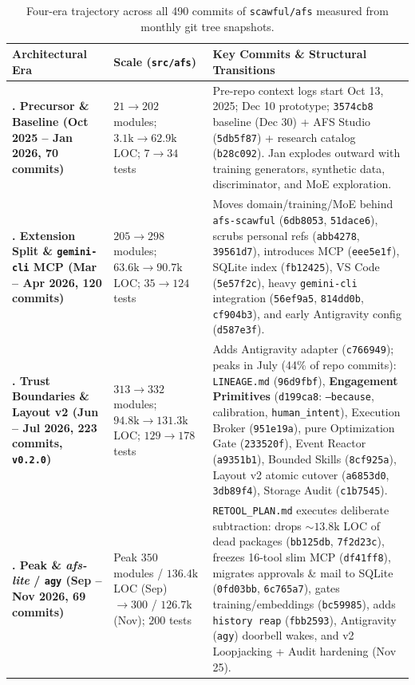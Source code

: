 \documentclass[10pt,letterpaper]{article}
\newcommand{\code}[1]{\texttt{\color{InkNavy}#1}}
\begin{document}
\begin{table}[ht!]
\centering
\sffamily\footnotesize
\begin{tabularx}{\textwidth}{@{}>{\raggedright\bfseries\arraybackslash}p{2.7cm} >{\raggedright\arraybackslash}p{2.6cm} >{\raggedright\arraybackslash}X@{}}
\toprule
\color{InkNavy}Architectural Era & \color{InkNavy}Scale (\code{src/afs}) & \color{InkNavy}Key Commits \& Structural Transitions \\
\midrule
1. Precursor \& Baseline (Oct 2025 -- Jan 2026, 70 commits) &
$21 \rightarrow 202$ modules; $3.1\text{k} \rightarrow 62.9\text{k}$ LOC; $7 \rightarrow 34$ tests &
Pre-repo context logs start Oct 13, 2025; Dec 10 prototype; \code{3574cb8} baseline (Dec 30) + AFS Studio (\code{5db5f87}) + research catalog (\code{b28c092}). Jan explodes outward with training generators, synthetic data, discriminator, and MoE exploration. \\
\addlinespace[2.5pt]
2. Extension Split \& \code{gemini-cli} MCP (Mar -- Apr 2026, 120 commits) &
$205 \rightarrow 298$ modules; $63.6\text{k} \rightarrow 90.7\text{k}$ LOC; $35 \rightarrow 124$ tests &
Moves domain/training/MoE behind \code{afs-scawful} (\code{6db8053}, \code{51dace6}), scrubs personal refs (\code{abb4278}, \code{39561d7}), introduces MCP (\code{eee5e1f}), SQLite index (\code{fb12425}), VS Code (\code{5e57f2c}), heavy \code{gemini-cli} integration (\code{56ef9a5}, \code{814dd0b}, \code{cf904b3}), and early Antigravity config (\code{d587e3f}). \\
\addlinespace[2.5pt]
3. Trust Boundaries \& Layout v2 (Jun -- Jul 2026, 223 commits, \code{v0.2.0}) &
$313 \rightarrow 332$ modules; $94.8\text{k} \rightarrow 131.3\text{k}$ LOC; $129 \rightarrow 178$ tests &
Adds Antigravity adapter (\code{c766949}); peaks in July (44\% of repo commits): \code{LINEAGE.md} (\code{96d9fbf}), \textbf{Engagement Primitives} (\code{d199ca8}: \code{--because}, calibration, \code{human\_intent}), Execution Broker (\code{951e19a}), pure Optimization Gate (\code{233520f}), Event Reactor (\code{a9351b1}), Bounded Skills (\code{8cf925a}), Layout v2 atomic cutover (\code{a6853d0}, \code{3db89f4}), Storage Audit (\code{c1b7545}). \\
\addlinespace[2.5pt]
4. Peak \& \emph{afs-lite} / \code{agy} (Sep -- Nov 2026, 69 commits) &
Peak $350$ modules / $136.4\text{k}$ LOC (Sep) $\rightarrow 300$ / $126.7\text{k}$ (Nov); $200$ tests &
\code{RETOOL\_PLAN.md} executes deliberate subtraction: drops $\sim 13.8\text{k}$ LOC of dead packages (\code{bb125db}, \code{7f2d23c}), freezes 16-tool slim MCP (\code{df41ff8}), migrates approvals \& mail to SQLite (\code{0fd03bb}, \code{6c765a7}), gates training/embeddings (\code{bc59985}), adds \code{history reap} (\code{fbb2593}), Antigravity (\code{agy}) doorbell wakes, and v2 Loopjacking + Audit hardening (Nov 25). \\
\bottomrule
\end{tabularx}
\caption{Four-era trajectory across all 490 commits of \code{scawful/afs} measured from monthly git tree snapshots.}
\label{tab:git_eras}
\end{table}
\end{document}
